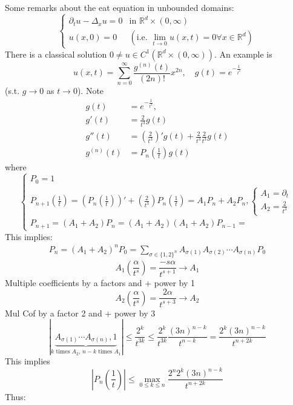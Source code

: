 \documentclass{report}
\theoremstyle{tommy}
\begin{document}
  Some remarks about the eat equation in unbounded domains:
  \[\begin{cases}
    \partial_t u - \Delta_x u = 0 &\text{in } \mathbb{R}^d \times (0,\infty) \\
    u(x,0) = 0 &(\text{i.e. \(\lim_{t \to 0} u(x,t) = 0 \forall x \in \mathbb{R}^d\)})
  \end{cases}\]
  There is a classical solution \(0\ne u \in C^1(\mathbb{R}^d \times (0,\infty))\).
  An example is 
  \[u(x,t) = \sum_{n=0}^\infty \frac{g^{(n)}(t)}{(2n)!} x^{2n}, \quad g(t) = e^{-\frac{1}{t^2}}\]
  (s.t. \(g \to 0\) as \(t \to 0\)). Note
  \begin{align*}
    g(t) &= e^{- \frac{1}{t^2}}, \\
    g'(t) &= \frac{2}{t^3} g(t) \\
    g''(t) &= \left(\frac{2}{t^3}\right)'g(t) + \frac{2}{t^3} \frac{2}{t^3} g(t) \\
    g^{(n)}(t) &= P_n \left(\frac{1}{t}\right)g(t)
  \end{align*}
  where
  \[\begin{cases}
    P_0 = 1 \\ P_{n+1} \left(\frac{1}{t}\right) = \left(P_n\left(\frac{1}{t}\right)\right)' + \left(\frac{2}{t^3}\right)P_n \left(\frac{1}{t}\right) = A_1 P_n + A_2 P_n, \begin{cases}
      A_1 = \partial_t \\ A_2 = \frac{2}{t^3}
    \end{cases}\\
    P_{n+1} = (A_1 + A_2) P_n = (A_1 + A_2) (A_1 + A_2)P_{n-1} = 
  \end{cases}\]
  This implies:
  \begin{align}
    P_n = (A_1 + A_2)^n P_0 = \sum_{\sigma \in \{1,2\}^n} A_{\sigma(1)} A_{\sigma(2)} \cdots A_{\sigma(n)} P_0
  \end{align}
  \[A_1 \left(\frac{\alpha}{t^s}\right) = \frac{-s\alpha}{t^{s+1}} \to A_1\]
  Multiple coefficients by a factors and \(+\) power by 1
  \[A_2 \left(\frac{\alpha}{t^s}\right) = \frac{2\alpha}{t^{s+3}} \to A_2\]
  Mul Cof by a factor 2 and + power by 3
  \[|\underbrace{A_{\sigma(1)} \cdots A_{\sigma(n)},1}_{\text{\(k\) times \(A_2\), \(n-k\) times \(A_1\)}}| \le \frac{2^k}{t^{3k}} \le \frac{2^k}{t^{3k}} \frac{(3n)^{n-k}}{t^{n-k}} = \frac{2^k(3n)^{n-k}}{t^{n+2k}}\]
  This implies 
  \[|P_n \left(\frac{1}{t}\right)| \le \max_{0 \le k \le n} \frac{2^n 2^k (3n)^{n-k}}{t^{n+2k}}\]
  Thus:
\end{document}
